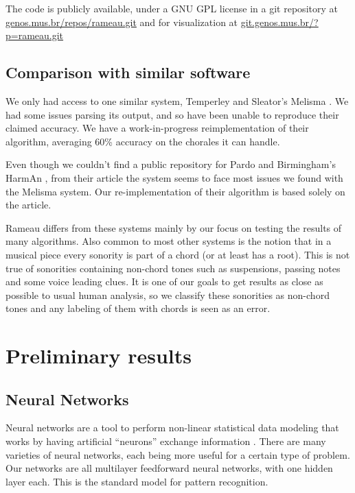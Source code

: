 \documentclass{article}
\begin{document}
The code is publicly available, under a GNU GPL \cite{fsf:gpl} license
in a git \cite{baudis:_git_users_manual} repository at
\url{genos.mus.br/repos/rameau.git} and for visualization at
\url{git.genos.mus.br/?p=rameau.git}

\subsection{Comparison with similar software}
\label{sec:differences-from-similar-software}

We only had access to one similar system, Temperley and Sleator's
Melisma \cite{temperley99:modeling}. We had some issues parsing its
output, and so have been unable to reproduce their claimed
accuracy. We have a work-in-progress reimplementation of their
algorithm, averaging 60\% accuracy on the chorales it can handle.

Even though we couldn't find a public repository for Pardo and
Birmingham's HarmAn \cite{pardo99:automated}, from their article the
system seems to face most issues we found with the Melisma system. Our
re-implementation of their algorithm is based solely on the article.

Rameau differs from these systems mainly by our focus on testing the
results of many algorithms. Also common to most other systems is the
notion that in a musical piece every sonority is part of a chord (or
at least has a root). This is not true of sonorities containing
non-chord tones such as suspensions, passing notes and some voice
leading clues. It is one of our goals to get results as close as
possible to usual human analysis, so we classify these sonorities as
non-chord tones and any labeling of them with chords is seen as an
error.

\section{Preliminary results}
\label{sec:analysis-results}

\subsection{Neural Networks}
\label{sec:neural-nets}

Neural networks are a tool to perform non-linear statistical data
modeling that works by having artificial ``neurons'' exchange
information \cite{russell02:aima}. There are
many varieties of neural networks, each being more useful for a
certain type of problem. Our networks are all multilayer feedforward
neural networks, with one hidden layer each. This is the standard
model for pattern recognition.
\end{document}

